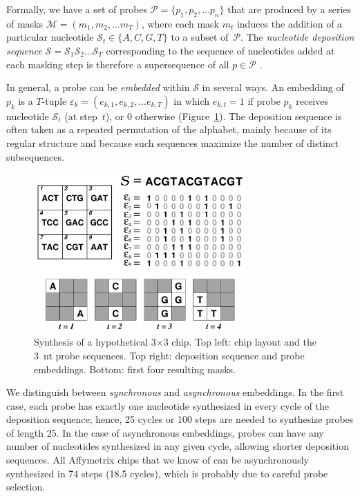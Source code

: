 \documentclass[english]{lni}
\newcommand{\ignore}[1]{}
\newcommand{\ds}{\mathcal{S}}
\begin{document}
Formally, we have a set of probes $\mathcal{P} = \{p_{1}, p_{2}, ... p_{n}\}$
that are produced by a series of masks
$\mathcal{M} = (m_{1}, m_{2}, ... m_T)$, where each mask $m_{t}$ induces the
addition of a particular nucleotide $\ds_{t} \in \{A, C, G, T\}$ to a subset
of~$\mathcal{P}$. The \emph{nucleotide deposition sequence}
$\ds = \ds_{1} \ds_{2} \ldots \ds_{T}$ corresponding to the sequence of
nucleotides added at each masking step is therefore a supersequence of all
$p \in \mathcal{P}$ \cite{RAHMANN03}.

In general, a probe can be \emph{embedded} within $\mathcal{S}$ in several ways.
An embedding of $p_k$ is a $T$-tuple
$\varepsilon_{k} = (e_{k,1}, e_{k,2}, ... e_{k,T})$ in which $e_{k,t} = 1$ if
probe $p_{k}$ receives nucleotide $\ds_t$ (at step~$t$), or 0 otherwise
(Figure~\ref{fig:masking_process}).
The deposition sequence is often taken as a repeated permutation of the
alphabet, mainly because of its regular structure and because such sequences
maximize the number of distinct subsequences. \ignore{ \cite{CHASE76}.}

\begin{figure}
\centerline{\includegraphics[width=230pt]{chip}}
\caption{Synthesis of a hypothetical 3$\times$3 chip. Top left: chip
layout and the 3~nt probe sequences. Top right: deposition
sequence and probe embeddings. Bottom: first four resulting masks.}
\label{fig:masking_process}
\end{figure}

We distinguish between \emph{synchronous} and \emph{asynchronous} embeddings.
In the first case, each probe has exactly one nucleotide synthesized in every
cycle of the deposition sequence; hence, 25 cycles or 100 steps are needed to
synthesize probes of length 25. In the case of asynchronous embeddings,
probes can have any number of nucleotides synthesized in any given cycle,
allowing shorter deposition sequences. All Affymetrix chips that we know of
can be asynchronously synthesized in 74 steps (18.5 cycles), which is probably
due to careful probe selection.
\end{document}
